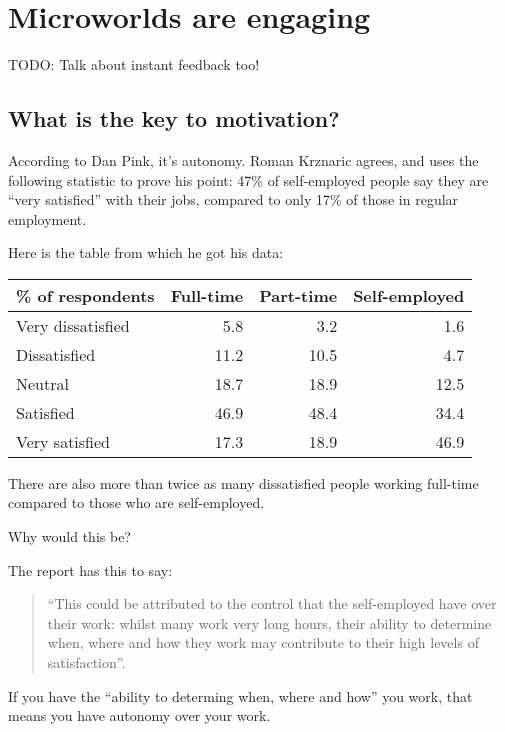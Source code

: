 \section{Microworlds are engaging}

TODO: Talk about instant feedback too!

\subsection{What is the key to motivation?}

According to Dan Pink, it's autonomy\cite{drive}. Roman Krznaric agrees, and uses
the following statistic to prove his point: 47\% of self-employed people
say they are ``very satisfied'' with their jobs, compared to only 17\% of those in regular employment\cite{krznaric}.

Here is the table from which he got his data\cite{joywork}:

\begin{center}
  \begin{tabular}{ | l | r | r | r | }
    \hline
    \textbf{\% of respondents} & \textbf{Full-time} & \textbf{Part-time} & \textbf{Self-employed} \\ \hline
    Very dissatisfied & 5.8 & 3.2 & 1.6 \\
    Dissatisfied & 11.2 & 10.5 & 4.7 \\
    Neutral & 18.7 & 18.9 & 12.5 \\
    Satisfied & 46.9 & 48.4 & 34.4 \\
    Very satisfied & 17.3 & 18.9 & 46.9 \\
    \hline
  \end{tabular}
\end{center}

There are also more than twice as many dissatisfied people working full-time
compared to those who are self-employed.

Why would this be?

The report has this to say:

\begin{quote}
``This could be attributed to the control that the self-employed have over
their work: whilst many work very long hours, their ability to determine
when, where and how they work may contribute to their high levels of
satisfaction''\cite{joywork}.
\end{quote}

If you have the ``ability to determing when, where and how'' you work,
that means you have autonomy over your work.

